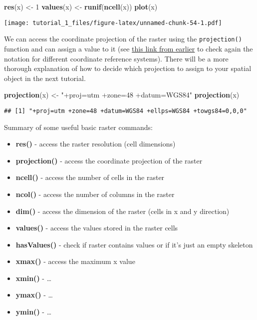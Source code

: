 \documentclass[]{article}
\newenvironment{Shaded}{\begin{snugshade}}{\end{snugshade}}
\newcommand{\DecValTok}[1]{\textcolor[rgb]{0.00,0.00,0.81}{#1}}
\newcommand{\KeywordTok}[1]{\textcolor[rgb]{0.13,0.29,0.53}{\textbf{#1}}}
\newcommand{\NormalTok}[1]{#1}
\newcommand{\StringTok}[1]{\textcolor[rgb]{0.31,0.60,0.02}{#1}}
\providecommand{\tightlist}{%
  \setlength{\itemsep}{0pt}\setlength{\parskip}{0pt}}
\begin{document}
\begin{Shaded}
\begin{Highlighting}[]
\KeywordTok{res}\NormalTok{(x) <-}\StringTok{ }\DecValTok{1}
\KeywordTok{values}\NormalTok{(x) <-}\StringTok{ }\KeywordTok{runif}\NormalTok{(}\KeywordTok{ncell}\NormalTok{(x))}
\KeywordTok{plot}\NormalTok{(x)}
\end{Highlighting}
\end{Shaded}

\texttt{[image: tutorial\_1\_files/figure-latex/unnamed-chunk-54-1.pdf]}

We can access the coordinate projection of the raster using the
\texttt{projection()} function and can assign a value to it (see
\href{http://rspatial.org/spatial/rst/6-crs.html}{this link from
earlier} to check again the notation for different coordinate reference
systems). There will be a more thorough explanation of how to decide
which projection to assign to your spatial object in the next tutorial.

\begin{Shaded}
\begin{Highlighting}[]
\KeywordTok{projection}\NormalTok{(x) <-}\StringTok{ "+proj=utm +zone=48 +datum=WGS84"}
\KeywordTok{projection}\NormalTok{(x)}
\end{Highlighting}
\end{Shaded}

\begin{verbatim}
## [1] "+proj=utm +zone=48 +datum=WGS84 +ellps=WGS84 +towgs84=0,0,0"
\end{verbatim}

Summary of some useful basic raster commands:

\begin{itemize}
\tightlist
\item
  \textbf{res()} - access the raster resolution (cell dimensions)
\item
  \textbf{projection()} - access the coordinate projection of the raster
\item
  \textbf{ncell()} - access the number of cells in the raster
\item
  \textbf{ncol()} - access the number of columns in the raster
\item
  \textbf{dim()} - access the dimension of the raster (cells in x and y
  direction)
\item
  \textbf{values()} - access the values stored in the raster cells
\item
  \textbf{hasValues()} - check if raster contains values or if it's just
  an empty skeleton
\item
  \textbf{xmax()} - access the maximum x value
\item
  \textbf{xmin()} - \ldots{}
\item
  \textbf{ymax()} - \ldots{}
\item
  \textbf{ymin()} - \ldots{}
\end{itemize}
\end{document}
